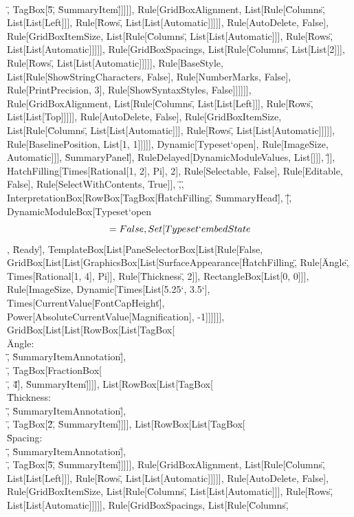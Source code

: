 \documentclass{article}
\begin{document}
{{{{\"\\[InvisibleSpace]\", TagBox[\"5\", \"SummaryItem\"]]]]], Rule[GridBoxAlignment, List[Rule[\"Columns\", List[List[Left]]], Rule[\"Rows\", List[List[Automatic]]]]],
Rule[AutoDelete, False], Rule[GridBoxItemSize, List[Rule[\"Columns\", List[List[Automatic]]], Rule[\"Rows\", List[List[Automatic]]]]], Rule[GridBoxSpacings,
List[Rule[\"Columns\", List[List[2]]], Rule[\"Rows\", List[List[Automatic]]]]], Rule[BaseStyle, List[Rule[ShowStringCharacters, False], Rule[NumberMarks,
False], Rule[PrintPrecision, 3], Rule[ShowSyntaxStyles, False]]]]]], Rule[GridBoxAlignment, List[Rule[\"Columns\", List[List[Left]]], Rule[\"Rows\",
List[List[Top]]]]], Rule[AutoDelete, False], Rule[GridBoxItemSize, List[Rule[\"Columns\", List[List[Automatic]]], Rule[\"Rows\", List[List[Automatic]]]]],
Rule[BaselinePosition, List[1, 1]]]]], Dynamic[Typeset`open$$], Rule[ImageSize, Automatic]]], \"SummaryPanel\"], RuleDelayed[DynamicModuleValues,
List[]]], \"]\"}], HatchFilling[Times[Rational[1, 2], Pi], 2], Rule[Selectable, False], Rule[Editable, False], Rule[SelectWithContents, True]], \",\",
InterpretationBox[RowBox[{TagBox[\"HatchFilling\", \"SummaryHead\"], \"[\", DynamicModuleBox[{Typeset`open$$ = False, Set[Typeset`embedState$$, \"Ready\"]},
TemplateBox[List[PaneSelectorBox[List[Rule[False, GridBox[List[List[GraphicsBox[List[SurfaceAppearance[\"HatchFilling\", Rule[\"Angle\", Times[Rational[1,
4], Pi]], Rule[\"Thickness\", 2]], RectangleBox[List[0, 0]]], Rule[ImageSize, Dynamic[Times[List[5.25`, 3.5`], Times[CurrentValue[\"FontCapHeight\"],
Power[AbsoluteCurrentValue[Magnification], -1]]]]]], GridBox[List[List[RowBox[List[TagBox[\"\\\"Angle: \\\"\", \"SummaryItemAnnotation\"], \"\\[InvisibleSpace]\",
TagBox[FractionBox[\"\\[Pi]\", \"4\"], \"SummaryItem\"]]]], List[RowBox[List[TagBox[\"\\\"Thickness: \\\"\", \"SummaryItemAnnotation\"], \"\\[InvisibleSpace]\",
TagBox[\"2\", \"SummaryItem\"]]]], List[RowBox[List[TagBox[\"\\\"Spacing: \\\"\", \"SummaryItemAnnotation\"], \"\\[InvisibleSpace]\", TagBox[\"5\",
\"SummaryItem\"]]]]], Rule[GridBoxAlignment, List[Rule[\"Columns\", List[List[Left]]], Rule[\"Rows\", List[List[Automatic]]]]], Rule[AutoDelete,
False], Rule[GridBoxItemSize, List[Rule[\"Columns\", List[List[Automatic]]], Rule[\"Rows\", List[List[Automatic]]]]], Rule[GridBoxSpacings, List[Rule[\"Columns\",
}}}}
\end{document}
